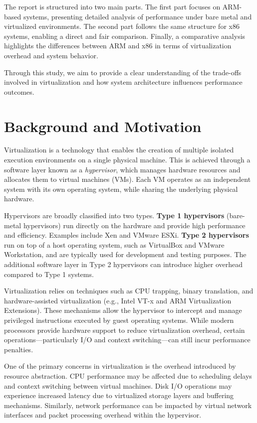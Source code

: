 \documentclass[conference]{IEEEtran}
\begin{document}
The report is structured into two main parts. The first part focuses on ARM-based systems, presenting detailed analysis of performance under bare metal and virtualized environments. The second part follows the same structure for x86 systems, enabling a direct and fair comparison. Finally, a comparative analysis highlights the differences between ARM and x86 in terms of virtualization overhead and system behavior.

Through this study, we aim to provide a clear understanding of the trade-offs involved in virtualization and how system architecture influences performance outcomes.

\section{Background and Motivation}

Virtualization is a technology that enables the creation of multiple isolated execution environments on a single physical machine. This is achieved through a software layer known as a \textit{hypervisor}, which manages hardware resources and allocates them to virtual machines (VMs). Each VM operates as an independent system with its own operating system, while sharing the underlying physical hardware.

Hypervisors are broadly classified into two types. \textbf{Type 1 hypervisors} (bare-metal hypervisors) run directly on the hardware and provide high performance and efficiency. Examples include Xen and VMware ESXi. \textbf{Type 2 hypervisors} run on top of a host operating system, such as VirtualBox and VMware Workstation, and are typically used for development and testing purposes. The additional software layer in Type 2 hypervisors can introduce higher overhead compared to Type 1 systems.

Virtualization relies on techniques such as CPU trapping, binary translation, and hardware-assisted virtualization (e.g., Intel VT-x and ARM Virtualization Extensions). These mechanisms allow the hypervisor to intercept and manage privileged instructions executed by guest operating systems. While modern processors provide hardware support to reduce virtualization overhead, certain operations—particularly I/O and context switching—can still incur performance penalties.

One of the primary concerns in virtualization is the overhead introduced by resource abstraction. CPU performance may be affected due to scheduling delays and context switching between virtual machines. Disk I/O operations may experience increased latency due to virtualized storage layers and buffering mechanisms. Similarly, network performance can be impacted by virtual network interfaces and packet processing overhead within the hypervisor.
\end{document}
